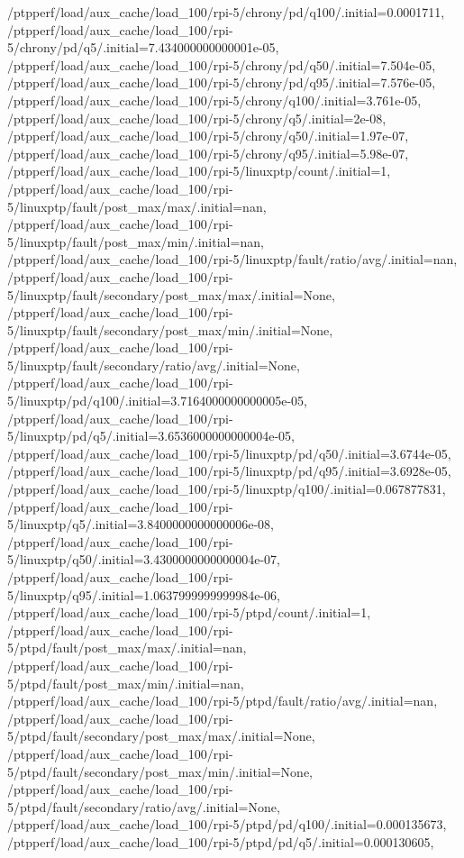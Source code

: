 {    /ptpperf/load/aux_cache/load_100/rpi-5/chrony/pd/q100/.initial=0.0001711,
    /ptpperf/load/aux_cache/load_100/rpi-5/chrony/pd/q5/.initial=7.434000000000001e-05,
    /ptpperf/load/aux_cache/load_100/rpi-5/chrony/pd/q50/.initial=7.504e-05,
    /ptpperf/load/aux_cache/load_100/rpi-5/chrony/pd/q95/.initial=7.576e-05,
    /ptpperf/load/aux_cache/load_100/rpi-5/chrony/q100/.initial=3.761e-05,
    /ptpperf/load/aux_cache/load_100/rpi-5/chrony/q5/.initial=2e-08,
    /ptpperf/load/aux_cache/load_100/rpi-5/chrony/q50/.initial=1.97e-07,
    /ptpperf/load/aux_cache/load_100/rpi-5/chrony/q95/.initial=5.98e-07,
    /ptpperf/load/aux_cache/load_100/rpi-5/linuxptp/count/.initial=1,
    /ptpperf/load/aux_cache/load_100/rpi-5/linuxptp/fault/post_max/max/.initial=nan,
    /ptpperf/load/aux_cache/load_100/rpi-5/linuxptp/fault/post_max/min/.initial=nan,
    /ptpperf/load/aux_cache/load_100/rpi-5/linuxptp/fault/ratio/avg/.initial=nan,
    /ptpperf/load/aux_cache/load_100/rpi-5/linuxptp/fault/secondary/post_max/max/.initial=None,
    /ptpperf/load/aux_cache/load_100/rpi-5/linuxptp/fault/secondary/post_max/min/.initial=None,
    /ptpperf/load/aux_cache/load_100/rpi-5/linuxptp/fault/secondary/ratio/avg/.initial=None,
    /ptpperf/load/aux_cache/load_100/rpi-5/linuxptp/pd/q100/.initial=3.7164000000000005e-05,
    /ptpperf/load/aux_cache/load_100/rpi-5/linuxptp/pd/q5/.initial=3.6536000000000004e-05,
    /ptpperf/load/aux_cache/load_100/rpi-5/linuxptp/pd/q50/.initial=3.6744e-05,
    /ptpperf/load/aux_cache/load_100/rpi-5/linuxptp/pd/q95/.initial=3.6928e-05,
    /ptpperf/load/aux_cache/load_100/rpi-5/linuxptp/q100/.initial=0.067877831,
    /ptpperf/load/aux_cache/load_100/rpi-5/linuxptp/q5/.initial=3.8400000000000006e-08,
    /ptpperf/load/aux_cache/load_100/rpi-5/linuxptp/q50/.initial=3.4300000000000004e-07,
    /ptpperf/load/aux_cache/load_100/rpi-5/linuxptp/q95/.initial=1.0637999999999984e-06,
    /ptpperf/load/aux_cache/load_100/rpi-5/ptpd/count/.initial=1,
    /ptpperf/load/aux_cache/load_100/rpi-5/ptpd/fault/post_max/max/.initial=nan,
    /ptpperf/load/aux_cache/load_100/rpi-5/ptpd/fault/post_max/min/.initial=nan,
    /ptpperf/load/aux_cache/load_100/rpi-5/ptpd/fault/ratio/avg/.initial=nan,
    /ptpperf/load/aux_cache/load_100/rpi-5/ptpd/fault/secondary/post_max/max/.initial=None,
    /ptpperf/load/aux_cache/load_100/rpi-5/ptpd/fault/secondary/post_max/min/.initial=None,
    /ptpperf/load/aux_cache/load_100/rpi-5/ptpd/fault/secondary/ratio/avg/.initial=None,
    /ptpperf/load/aux_cache/load_100/rpi-5/ptpd/pd/q100/.initial=0.000135673,
    /ptpperf/load/aux_cache/load_100/rpi-5/ptpd/pd/q5/.initial=0.000130605,
}
